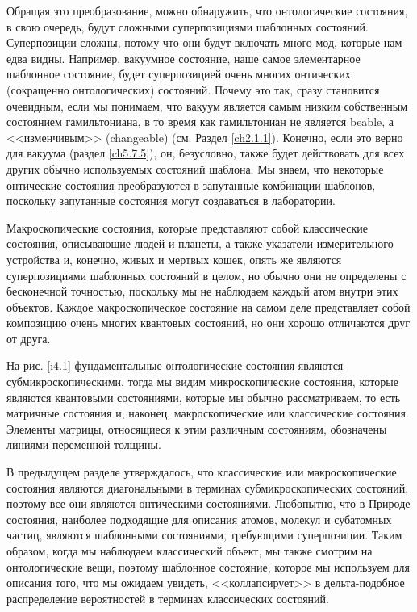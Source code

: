 \documentclass[main.tex]{subfiles}
\begin{document}
Обращая это преобразование, можно обнаружить, что онтологические состояния, в свою очередь, будут сложными суперпозициями шаблонных состояний. Суперпозиции сложны, потому что они будут включать много мод, которые нам едва видны. Например, вакуумное состояние, наше самое элементарное шаблонное состояние, будет суперпозицией очень многих онтических (сокращенно онтологических) состояний. Почему это так, сразу становится очевидным, если мы понимаем, что вакуум является самым низким собственным состоянием гамильтониана, в то время как гамильтониан не является beable, а <<изменчивым>> (changeable) (см. Раздел \ref{ch2.1.1}). Конечно, если это верно для вакуума (раздел \ref{ch5.7.5}), он, безусловно, также будет действовать для всех других обычно используемых состояний шаблона. Мы знаем, что некоторые онтические состояния преобразуются в запутанные комбинации шаблонов, поскольку запутанные состояния могут создаваться в лаборатории.

Макроскопические состояния, которые представляют собой классические состояния, описывающие людей и планеты, а также указатели измерительного устройства и, конечно, живых и мертвых кошек, опять же являются суперпозициями шаблонных состояний в целом, но обычно они не определены с бесконечной точностью, поскольку мы не наблюдаем каждый атом внутри этих объектов. Каждое макроскопическое состояние на самом деле представляет собой композицию очень многих квантовых состояний, но они хорошо отличаются друг от друга.

На рис. \ref{i4.1} фундаментальные онтологические состояния являются субмикроскопическими, тогда мы видим микроскопические состояния, которые являются квантовыми состояниями, которые мы обычно рассматриваем, то есть матричные состояния и, наконец, макроскопические или классические состояния. Элементы матрицы, относящиеся к этим различным состояниям, обозначены линиями переменной толщины.

В предыдущем разделе утверждалось, что классические или макроскопические состояния являются диагональными в терминах субмикроскопических состояний, поэтому все они являются онтическими состояниями. Любопытно, что в Природе состояния, наиболее подходящие для описания атомов, молекул и субатомных частиц, являются шаблонными состояниями, требующими суперпозиции. Таким образом, когда мы наблюдаем классический объект, мы также смотрим на онтологические вещи, поэтому шаблонное состояние, которое мы используем для описания того, что мы ожидаем увидеть, <<коллапсирует>> в дельта-подобное распределение вероятностей в терминах классических состояний.
\end{document}
